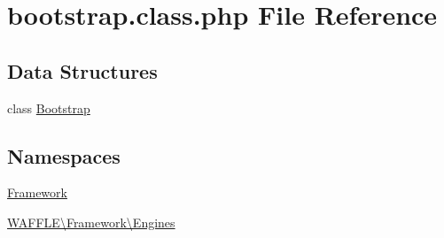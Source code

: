\hypertarget{bootstrap_8class_8php}{}\section{bootstrap.\+class.\+php File Reference}
\label{bootstrap_8class_8php}
\subsection*{Data Structures}
\begin{DoxyCompactItemize}
\item 
class \hyperlink{class_w_a_f_f_l_e_1_1_framework_1_1_engines_1_1_bootstrap}{Bootstrap}
\end{DoxyCompactItemize}
\subsection*{Namespaces}
\begin{DoxyCompactItemize}
\item 
 \hyperlink{namespace_framework}{Framework}
\item 
 \hyperlink{namespace_w_a_f_f_l_e_1_1_framework_1_1_engines}{W\+A\+F\+F\+L\+E\textbackslash{}\+Framework\textbackslash{}\+Engines}
\end{DoxyCompactItemize}
